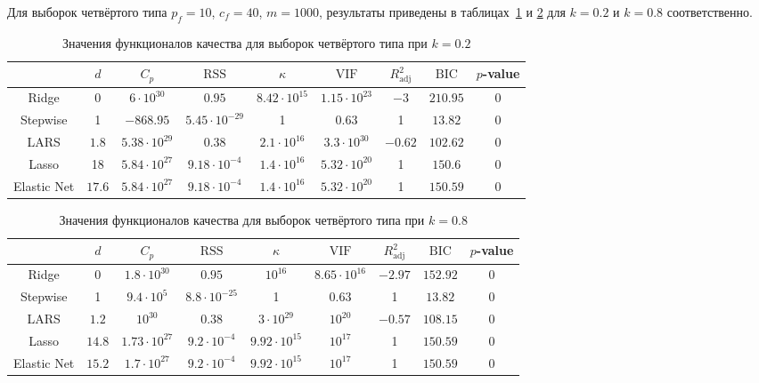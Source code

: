 \documentclass[a4paper,12pt]{article}
\newcommand{\vif}{\mathrm{VIF}}
\newcommand{\rss}{\mathrm{RSS}}
\newcommand{\bic}{\mathrm{BIC}}
\newcommand{\radj}{R_{\text{adj}}^2}
\theoremstyle{plain}
\begin{document}
Для выборок четвёртого типа $p_f = 10$, $ c_f = 40$, $m = 1000$, результаты приведены в таблицах~\ref{tab:sumort_0.2} и \ref{tab:sumort_0.8} для $k = 0.2$ и $k = 0.8$ соответственно.
\begin{table}[!h]
\centering
\caption{Значения функционалов качества для выборок четвёртого типа при $k = 0.2$}
\begin{tabular}{|c|c|c|c|c|c|c|c|c|}
\hline 
 & $d$ & $C_p$ & $\rss$ & $\kappa$ & $\vif$ & $\radj$ & $\bic$ & $p$-value \\ 
\hline 
Ridge & 0 & $6 \cdot 10^{30}$ & $0.95$ & $8.42 \cdot 10^{15}$ & $ 1.15 \cdot 10^{23} $ & $-3$ & $210.95$ & 0 \\ 
\hline 
Stepwise & 1 & $-868.95$ & $ 5.45 \cdot 10^{-29} $ & 1 & $0.63$ & 1 & $13.82$ & 0 \\
\hline
LARS & $1.8$ & $ 5.38 \cdot 10^{29} $ & $ 0.38$ & $ 2.1 \cdot 10^{16}$ & $3.3 \cdot 10^{30}$ & $-0.62$ & $102.62$  & 0 \\ 
\hline 
Lasso & 18 & $5.84 \cdot 10^{27}$ & $ 9.18 \cdot 10^{-4}$ & $1.4 \cdot 10^{16}$ & $ 5.32 \cdot 10^{20}$ & 1  & $150.6$ & 0 \\ 
\hline 
Elastic Net & $17.6$ & $5.84 \cdot 10^{27}$ & $ 9.18 \cdot 10^{-4}$ & $1.4 \cdot 10^{16}$ & $ 5.32 \cdot 10^{20} $ & 1 & $150.59$ & 0 \\
\hline
\end{tabular}
\label{tab:sumort_0.2}
\end{table} 

\begin{table}[!h]
\centering
\caption{Значения функционалов качества для выборок четвёртого типа при $k = 0.8$}
\begin{tabular}{|c|c|c|c|c|c|c|c|c|}
\hline 
 & $d$ & $C_p$ & $\rss$ & $\kappa$ & $\vif$ & $\radj$ & $\bic$ & $p$-value \\ 
\hline 
Ridge & 0 & $1.8 \cdot 10^{30}$ & $0.95$ & $10^{16}$ & $8.65 \cdot 10^{16}$ & $-2.97$ & $152.92$ & 0 \\ 
\hline
Stepwise & 1 & $9.4 \cdot 10^5$ & $8.8 \cdot 10^{-25}$ & 1 & $0.63$ & 1 & $13.82$ & 0 \\
\hline  
LARS & $1.2$ & $10^{30}$ & $0.38$ & $3 \cdot 10^{29}$ & $10^{20}$ & $-0.57$ & $108.15$ & 0 \\ 
\hline
Lasso & $ 14.8 $ & $ 1.73 \cdot 10^{27}$ & $ 9.2 \cdot 10^{-4}$ & $ 9.92 \cdot 10^{15}$ & $ 10^{17}$ & 1 & $150.59$ & 0 \\ 
\hline 
Elastic Net & $15.2$ & $1.7 \cdot 10^{27}$ & $9.2 \cdot 10^{-4}$ & $9.92 \cdot 10^{15}$ & $10^{17}$ & 1 & $150.59$ & 0 \\
\hline
\end{tabular}
\label{tab:sumort_0.8}
\end{table} 
\end{document}
